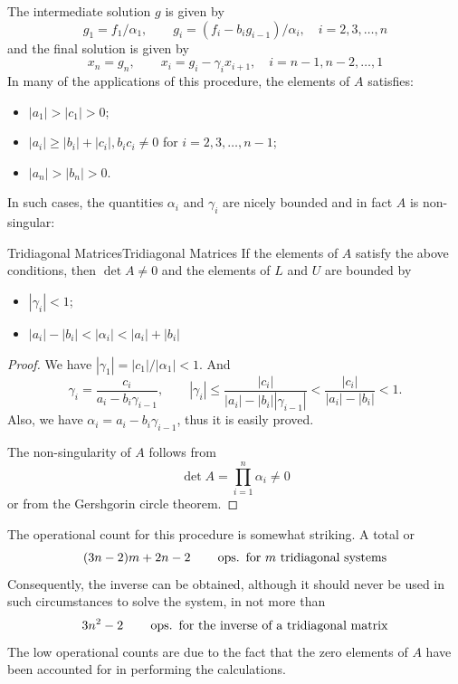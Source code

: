 \documentclass[../main.tex]{subfiles}
\begin{document}
The intermediate solution $g$ is given by
\begin{equation*}
	g_1 = f_1 / \alpha_1, \qquad g_i = (f_i - b_i g_{i-1}) / \alpha_i, \quad i = 2, 3, \ldots, n
\end{equation*}
and the final solution is given by
\begin{equation*}
	x_n = g_n, \qquad x_i = g_i - \gamma_i x_{i+1}, \quad i = n-1, n-2, \ldots, 1
\end{equation*}
In many of the applications of this procedure, the elements of $A$ satisfies:
\begin{itemize}
	\item $|a_1| > |c_1| > 0$;
	\item $|a_i| \geq |b_i| + |c_i|, b_i c_i \neq 0$ for $i = 2, 3, \ldots, n-1$;
	\item $|a_n| > |b_n| > 0$.
\end{itemize}
In such cases, the quantities $\alpha_i$ and $\gamma_i$ are nicely bounded and in fact $A$ is non-singular:
\begin{theorem}{Tridiagonal Matrices}{Tridiagonal Matrices}
	If the elements of $A$ satisfy the above conditions, then $\det A \neq 0$ and the elements of $L$ and $U$ are bounded by
	\begin{itemize}
		\item $|\gamma_i| < 1$;
		\item $|a_i| - |b_i| < |\alpha_i| < |a_i| + |b_i|$
	\end{itemize}
\end{theorem}
\begin{proof}
	We have $|\gamma_1| = |c_1| / |\alpha_1| < 1$. And
	\begin{equation*}
		\gamma_i = \frac{c_i}{a_i - b_i \gamma_{i-1}}, \qquad |\gamma_i| \leq \frac{|c_i|}{|a_i| - |b_i||\gamma_{i-1}|} < \frac{|c_i|}{|a_i| - |b_i|} < 1.
	\end{equation*}
	Also, we have $\alpha_i = a_i - b_i \gamma_{i-1}$, thus it is easily proved.

	The non-singularity of $A$ follows from
	\begin{equation*}
		\det A = \prod_{i=1}^n \alpha_i \neq 0
	\end{equation*}
	or from the Gershgorin circle theorem.
\end{proof}

The operational count for this procedure is somewhat striking. A total or
\begin{equation*}
	(3n-2) m + 2 n - 2 \qquad \operatorname{ops.} \text{ for $m$ tridiagonal systems}
\end{equation*}
Consequently, the inverse can be obtained, although it should never be used in such circumstances to solve the system, in not more than
\begin{equation*}
	3n^2 - 2 \qquad \operatorname{ops.} \text{ for the inverse of a tridiagonal matrix}
\end{equation*}
The low operational counts are due to the fact that the zero elements of $A$ have been accounted for in performing the calculations.
\end{document}
